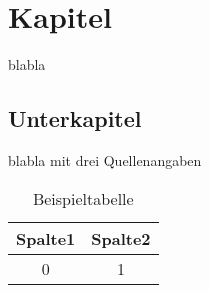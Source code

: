 \section{Kapitel}

blabla

\subsection{Unterkapitel}

blabla mit drei Quellenangaben\cite{ietf-ipfix-protocol,snoeren2001hash,belenky2003ip}

\begin{figure}[h]%
 	\begin{center}%
 	\end{center}%
\end{figure}

\begin{table}[h]%
 	\begin{center}%
		\caption{Beispieltabelle}\label{tab:example}%
	 	\begin{tabular}{c|c}%
 			Spalte1 & Spalte2\\
 			\hline
 			0 & 1\\
 		\end{tabular}%
 	\end{center}%
\end{table}
